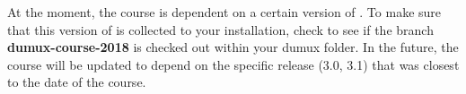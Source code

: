At the moment, the \Dumux course is dependent on a certain version of
\Dumux. To make sure that this version of \Dumux is collected to your installation, 
check to see if the branch \textbf{dumux-course-2018}
is checked out within your dumux folder.
In the future, the \Dumux course will be updated to depend on
the specific release (3.0, 3.1) that was closest to the date of the course.